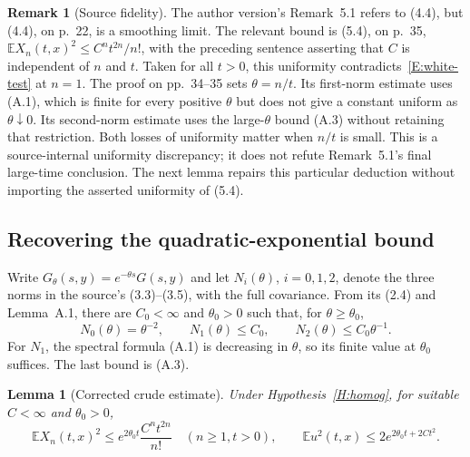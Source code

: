 \documentclass[12pt]{article}
\numberwithin{equation}{section}
\newtheorem{lemma}[theorem]{Lemma}
\theoremstyle{definition}
\newtheorem{remark}[theorem]{Remark}
\newcommand{\E}{\mathbb{E}}
\begin{document}
\begin{remark}[Source fidelity]\label{R:source-uniformity}
  The author version's Remark~5.1 refers to (4.4), but (4.4), on p.~22,
  is a smoothing limit. The relevant bound is (5.4), on p.~35,
  $\E X_n(t,x)^2\le C^nt^{2n}/n!$, with the preceding sentence asserting
  that $C$ is independent of $n$ and $t$. Taken for all $t>0$, this
  uniformity contradicts~\eqref{E:white-test} at $n=1$.
  The proof on pp.~34--35 sets $\theta=n/t$. Its first-norm estimate
  uses (A.1), which is finite for every positive $\theta$ but does not
  give a constant uniform as $\theta\downarrow0$. Its second-norm
  estimate uses the large-$\theta$ bound (A.3) without retaining that
  restriction. Both losses of uniformity matter when $n/t$ is small.
  This is a source-internal uniformity discrepancy; it does not refute
  Remark~5.1's final large-time conclusion. The next lemma repairs this
  particular deduction without importing the asserted uniformity of (5.4).
\end{remark}

\subsection{Recovering the quadratic-exponential bound}

Write $G_\theta(s,y)=e^{-\theta s}G(s,y)$ and let
$N_i(\theta)$, $i=0,1,2$, denote the three norms in the source's
(3.3)--(3.5), with the full covariance. From its (2.4) and Lemma~A.1,
there are $C_0<\infty$ and $\theta_0>0$ such that, for
$\theta\ge\theta_0$,
\begin{equation}\label{E:crude-norms}
  N_0(\theta)=\theta^{-2},\qquad
  N_1(\theta)\le C_0,\qquad N_2(\theta)\le C_0\theta^{-1}.
\end{equation}
For $N_1$, the spectral formula (A.1) is decreasing in $\theta$, so its
finite value at $\theta_0$ suffices. The last bound is (A.3).

\begin{lemma}[Corrected crude estimate]\label{L:crude-corrected}
  Under Hypothesis~\ref{H:homog}, for suitable $C<\infty$ and
  $\theta_0>0$,
  \begin{equation}\label{E:crude-corrected}
    \E X_n(t,x)^2\le e^{2\theta_0t}\frac{C^nt^{2n}}{n!}
    \quad(n\ge1,t>0),\qquad
    \E u^2(t,x)\le2e^{2\theta_0t+2Ct^2}.
  \end{equation}
\end{lemma}
\end{document}
